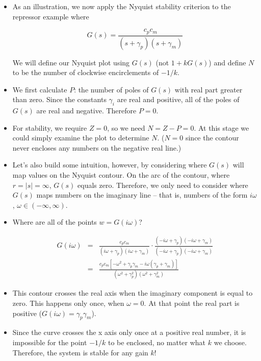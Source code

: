 \documentclass{article}
\begin{document}
\begin{itemize}

\item As an illustration, we now apply the Nyquist stability criterion to the repressor example where

\[ G(s) =  \frac{c_p c_m}{\left( s + \gamma_p \right)\left( s + \gamma_m \right)} \]

We will define our Nyquist plot using $G(s)$ (not $1 + kG(s)$) and define $N$ to be the number of clockwise encirclements of $-1/k$.

\item We first calculate $P$: the number of poles of $G(s)$ with real part greater than zero. Since the constants $\gamma_i$ are real and positive, all of the poles of $G(s)$ are real and negative. Therefore $P=0$.

\item  For stability, we require $Z=0$, so we need $N=Z-P=0$. At this stage we could simply examine the plot to determine $N$. ($N=0$ since the contour never encloses any numbers on the negative real line.)

\item Let's also build some intuition, however, by considering where $G(s)$ will map values on the Nyquist contour. On the arc of the contour, where $r = |s|=\infty$, $G(s)$ equals zero. Therefore, we only need to consider where $G(s)$ maps numbers on the imaginary line -- that is, numbers of the form $i\omega$, $\omega \in (-\infty, \infty)$.
\item Where are all of the points $w=G(i\omega)$?

\begin{eqnarray*}
G(i \omega) & = &  \frac{c_p c_m}{\left( i\omega + \gamma_p \right)\left( i\omega + \gamma_m \right)} \cdot \frac{\left(- i\omega + \gamma_p \right)\left( - i\omega + \gamma_m \right)}{\left(- i\omega + \gamma_p \right)\left(- i\omega + \gamma_m \right)}\\
& = & \frac{c_p c_m \left[  - \omega^2 + \gamma_p \gamma_m -i \omega \left(\gamma_p + \gamma_m \right) \right]}{\left( \omega^2 + \gamma_p^2 \right)\left( \omega^2 + \gamma_m^2 \right)}
\end{eqnarray*}

\item This contour crosses the real axis when the imaginary component is equal to zero. This happens only once, when $\omega=0$. At that point the real part is positive ($G(i \omega) = \gamma_p \gamma_m$).

\item Since the curve crosses the x axis only once at a positive real number, it is impossible for the point $-1/k$ to be enclosed, no matter what $k$ we choose. Therefore, the system is stable for any gain $k$!

\end{itemize}
\end{document}
